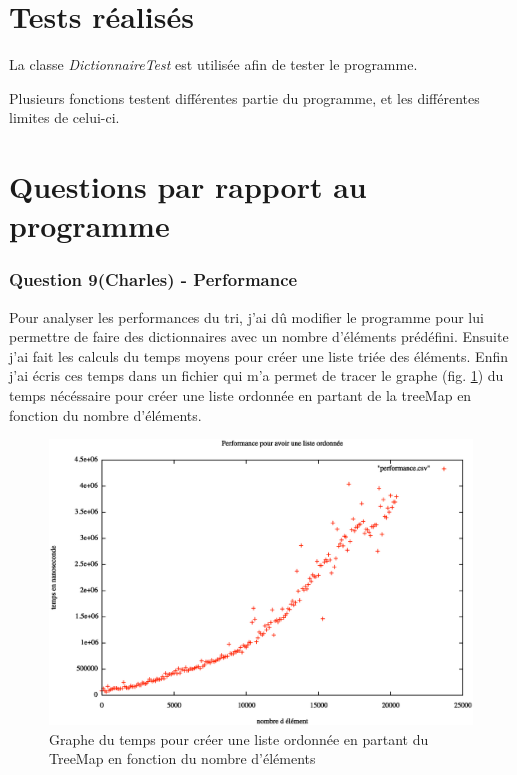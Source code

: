 \documentclass[a4paper]{article}
\begin{document}
\section*{Tests réalisés}

La classe \textit{DictionnaireTest} est utilisée afin de tester le programme.

Plusieurs fonctions testent différentes partie du programme, et les différentes limites de celui-ci. 

\section*{Questions par rapport au programme}

\subsubsection*{Question 9(Charles) - Performance}

Pour analyser les performances du tri, j'ai dû modifier le programme pour lui permettre de faire des dictionnaires avec un nombre d'éléments prédéfini. Ensuite j'ai fait les calculs du temps moyens pour créer une liste triée des éléments. Enfin j'ai écris ces temps dans un fichier qui m'a permet de tracer le graphe (fig. \ref{perfo}) du temps nécéssaire pour créer une liste ordonnée en partant de la treeMap en fonction du nombre d'éléments.


\begin{figure} [H]
\begin{center}
\includegraphics[scale=0.4]{performanceListeOrdonnee.eps}
\caption{Graphe du temps pour créer une liste ordonnée en partant du TreeMap en fonction du nombre d'éléments}
\label{perfo}
\end{center}
\end{figure}
\end{document}
